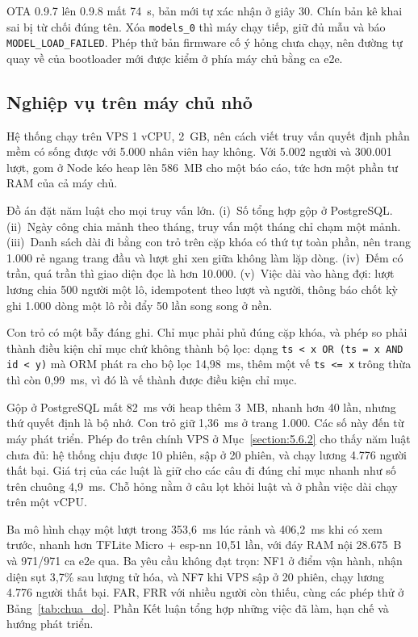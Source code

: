 \documentclass[../DoAn.tex]{subfiles}
\begin{document}
OTA 0.9.7 lên 0.9.8 mất 74~s, bản mới tự xác nhận ở giây 30. Chín bản kê khai sai bị từ chối đúng tên. Xóa \texttt{models\_0} thì máy chạy tiếp, giữ đủ mẫu và báo
\texttt{MODEL\_LOAD\_FAILED}. Phép thử bản firmware cố ý hỏng chưa chạy, nên đường tự quay về của bootloader mới được kiểm ở phía máy chủ bằng ca e2e.

\subsection{Nghiệp vụ trên máy chủ nhỏ}
\label{section:5.8.7}

Hệ thống chạy trên VPS 1 vCPU, 2~GB, nên cách viết truy vấn quyết định phần mềm có sống được với 5.000 nhân viên hay không. Với 5.002 người và 300.001 lượt, gom ở Node kéo heap
lên 586~MB cho một báo cáo, tức hơn một phần tư RAM của cả máy chủ.

Đồ án đặt năm luật cho mọi truy vấn lớn. (i)~Số tổng hợp gộp ở PostgreSQL. (ii)~Ngày công chia mảnh theo tháng, truy vấn một tháng chỉ chạm một mảnh. (iii)~Danh sách dài đi bằng con
trỏ trên cặp khóa có thứ tự toàn phần, nên trang 1.000 rẻ ngang trang đầu và lượt ghi xen giữa không làm lặp dòng. (iv)~Đếm có trần, quá trần thì giao diện đọc là hơn 10.000.
(v)~Việc dài vào hàng đợi: lượt lương chia 500 người một lô, idempotent theo lượt và người, thông báo chốt kỳ ghi 1.000 dòng một lô rồi đẩy 50 lần song song ở nền.

Con trỏ có một bẫy đáng ghi. Chỉ mục phải phủ đúng cặp khóa, và phép so phải thành điều kiện chỉ mục chứ không thành bộ lọc: dạng \texttt{ts < x OR (ts = x AND id < y)} mà ORM
phát ra cho bộ lọc 14,98~ms, thêm một vế \texttt{ts <= x} trông thừa thì còn 0,99~ms, vì đó là vế thành được điều kiện chỉ mục.

Gộp ở PostgreSQL mất 82~ms với heap thêm 3~MB, nhanh hơn 40 lần, nhưng thứ quyết định là bộ nhớ. Con trỏ giữ 1,36~ms ở trang 1.000. Các số này đến từ máy phát triển. Phép đo trên chính VPS ở
Mục~\ref{section:5.6.2} cho thấy năm luật chưa đủ: hệ thống chịu được 10 phiên, sập ở 20 phiên, và chạy lương 4.776 người thất bại. Giá trị của các luật là giữ cho các câu đi đúng chỉ mục nhanh như số
trên chuông 4,9~ms. Chỗ hỏng nằm ở câu lọt khỏi luật và ở phần việc dài chạy trên một vCPU.

Ba mô hình chạy một lượt trong 353,6~ms lúc rảnh và 406,2~ms khi có xem trước, nhanh hơn TFLite Micro + esp-nn 10,51 lần, với đáy RAM nội 28.675~B và 971/971 ca e2e qua. Ba yêu cầu không đạt trọn: NF1 ở
điểm vận hành, nhận diện sụt 3,7\% sau lượng tử hóa, và NF7 khi VPS sập ở 20 phiên, chạy lương 4.776 người thất bại. FAR, FRR với nhiều người còn thiếu, cùng các phép thử ở Bảng~\ref{tab:chua_do}. Phần Kết
luận tổng hợp những việc đã làm, hạn chế và hướng phát triển.
\end{document}
